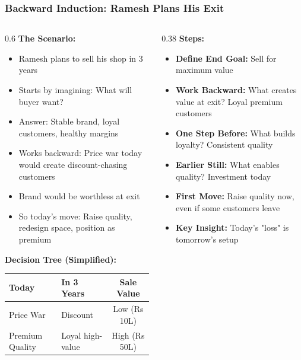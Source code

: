 \begin{frame}[fragile]\frametitle{Backward Induction: Ramesh Plans His Exit}
\begin{columns}
    \begin{column}[T]{0.6\linewidth}
      \textbf{The Scenario:}
      \begin{itemize}
        \item Ramesh plans to sell his shop in 3 years
        \item Starts by imagining: What will buyer want?
        \item Answer: Stable brand, loyal customers, healthy margins
        \item Works backward: Price war today would create discount-chasing customers
        \item Brand would be worthless at exit
        \item So today's move: Raise quality, redesign space, position as premium
      \end{itemize}
      
      \vspace{2pt}
      \textbf{Decision Tree (Simplified):}
      \begin{center}
      \small
      \begin{tabular}{|l|l|c|}
        \hline
        \textbf{Today} & \textbf{In 3 Years} & \textbf{Sale Value} \\
        \hline
        Price War & Discount  & Low (Rs 10L) \\
        \hline
        Premium Quality & Loyal high-value  & High (Rs 50L) \\
        \hline
      \end{tabular}
      \end{center}
    \end{column}
    \begin{column}[T]{0.38\linewidth}
      \textbf{Steps:}
      \begin{itemize}
        \item \textbf{Define End Goal:} Sell for maximum value
        \item \textbf{Work Backward:} What creates value at exit? Loyal premium customers
        \item \textbf{One Step Before:} What builds loyalty? Consistent quality
        \item \textbf{Earlier Still:} What enables quality? Investment today
        \item \textbf{First Move:} Raise quality now, even if some customers leave
        \item \textbf{Key Insight:} Today's "loss" is tomorrow's setup
      \end{itemize}
    \end{column}
  \end{columns}
\end{frame}


